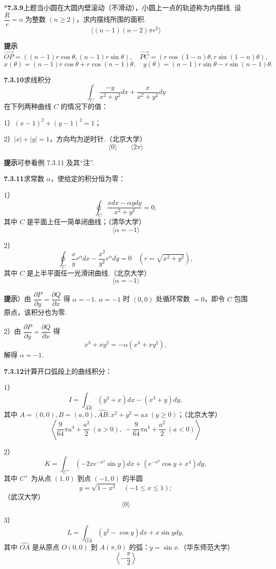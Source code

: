 \documentclass[UTF8,12pt,a4paper,fontset=fandol]{ctexart}
\begin{document}
\noindent\textbf{$*$7.3.9}\quad 上题当小圆在大圆内壁滚动（不滑动），小圆上一点的轨迹称为内摆线. 设 $\dfrac Rr=n$ 为整数 $(n\ge2)$，求内摆线所围的面积.
\[
\langle (n-1)(n-2)\pi r^2\rangle
\]

\noindent\textbf{提示}\quad
\[
\overrightarrow{OP}=((n-1)r\cos\theta,(n-1)r\sin\theta),
\quad
\overrightarrow{PC}=(r\cos(1-n)\theta,r\sin(1-n)\theta),
\]
\[
x(\theta)=(n-1)r\cos\theta+r\cos(n-1)\theta,\quad
y(\theta)=(n-1)r\sin\theta-r\sin(n-1)\theta.
\]

\noindent\textbf{7.3.10}\quad 求线积分
\[
\int_C\frac{-y}{x^2+y^2}dx+\frac{x}{x^2+y^2}dy
\]
在下列两种曲线 $C$ 的情况下的值：

1）$(x-1)^2+(y-1)^2=1$；

2）$|x|+|y|=1$，方向均为逆时针.（北京大学）
\[
\langle0\rangle\qquad \langle2\pi\rangle
\]

\noindent\textbf{提示}\quad 可参看例 7.3.11 及其“注”.

\noindent\textbf{7.3.11}\quad 求常数 $\alpha$，使给定的积分恒为零：

1）
\[
\oint_C\frac{xdx-\alpha ydy}{x^2+y^2}=0,
\]
其中 $C$ 是平面上任一简单闭曲线；（清华大学）
\[
\langle\alpha=-1\rangle
\]

2）
\[
\oint_C\frac xy r^\alpha dx-\frac{x^2}{y^2}r^\alpha dy=0
\quad\left(r=\sqrt{x^2+y^2}\right),
\]
其中 $C$ 是上半平面任一光滑闭曲线.（北京大学）
\[
\langle\alpha=-1\rangle
\]

\noindent\textbf{提示}）由 $\dfrac{\partial P}{\partial y}=\dfrac{\partial Q}{\partial x}$ 得 $\alpha=-1$. $\alpha=-1$ 时 $(0,0)$ 处循环常数 $=0$，即令 $C$ 包围原点，该积分也为零.

2）由 $\dfrac{\partial P}{\partial y}=\dfrac{\partial Q}{\partial x}$ 得
\[
x^3+xy^2=-\alpha(x^3+xy^2),
\]
解得 $\alpha=-1$.

\noindent\textbf{7.3.12}\quad 计算开口弧段上的曲线积分：

1）
\[
I=\int_{\widehat{AB}}(y^3+x)dx-(x^3+y)dy,
\]
其中 $A=(0,0),B=(a,0),\widehat{AB}:x^2+y^2=ax\ (y\ge0)$；（北京大学）
\[
\left\langle \frac9{64}\pi a^4+\frac{a^2}2\ (a>0),\ -\frac9{64}\pi a^4+\frac{a^2}2\ (a<0)\right\rangle
\]

2）
\[
K=\int_{C^+}(-2xe^{-x^2}\sin y)dx+(e^{-x^2}\cos y+x^4)dy,
\]
其中 $C^+$ 为从点 $(1,0)$ 到点 $(-1,0)$ 的半圆
\[
y=\sqrt{1-x^2}\quad(-1\le x\le1);
\]
（武汉大学）
\[
\langle0\rangle
\]

3）
\[
L=\int_{\widehat{OA}}(y^2-\cos y)dx+x\sin ydy,
\]
其中 $\widehat{OA}$ 是从原点 $O(0,0)$ 到 $A(\pi,0)$ 的弧：$y=\sin x$.（华东师范大学）
\[
\left\langle-\frac\pi2\right\rangle
\]
\end{document}
